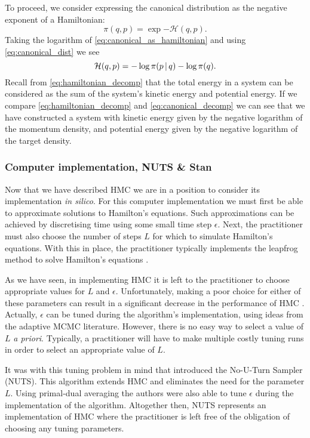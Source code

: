 To proceed, we consider expressing the canonical distribution as the
negative exponent of a Hamiltonian:
\begin{equation}
  \label{eq:canonical_as_hamiltonian}
  \pi(q, p) = \exp{-\mathcal{H}(q,p)}.
\end{equation}
Taking the logarithm of \cref{eq:canonical_as_hamiltonian} and using \cref{eq:canonical_dist}
we see
\begin{equation}
  \label{eq:canonical_decomp}
  \mathcal{H}(q, p) = -\log{\pi(p \,|\,q)} - \log{\pi(q)}.
\end{equation}
Recall from \cref{eq:hamiltonian_decomp} that the total energy in a system can be
considered as the sum of the system's kinetic energy and potential energy.  If we compare
\cref{eq:hamiltonian_decomp} and \cref{eq:canonical_decomp} we can see that we have
constructed a system with kinetic energy given by the negative logarithm of the momentum
density, and potential energy given by the negative logarithm of the target density.

\subsubsection{Computer implementation, NUTS \& Stan}

Now that we have described HMC we are in a position to consider its implementation
\emph{in silico}. For this computer implementation we must first be able to approximate
solutions to Hamilton's equations. Such approximations can be achieved by discretising
time using some small time step $\epsilon$. Next, the practitioner must also choose the
number of steps $L$ for which to simulate Hamilton's equations. With this in place, the
practitioner typically implements the leapfrog method to solve Hamilton's equations
\parencite{neal11}.

As we have seen, in implementing HMC it is left to the practitioner to choose appropriate
values for $L$ and $\epsilon$. Unfortunately, making a poor choice for either of these
parameters can result in a significant decrease in the performance of HMC
\parencite{hoffman14}. Actually, $\epsilon$ can be tuned during the algorithm's
implementation, using ideas from the adaptive MCMC literature. However, there is no easy
way to select a value of $L$ \emph{a priori}. Typically, a practitioner will have to make
multiple costly tuning runs in order to select an appropriate value of $L$.

It was with this tuning problem in mind that \textcite{hoffman14} introduced the No-U-Turn
Sampler (NUTS). This algorithm extends HMC and eliminates the need for the parameter $L$.
Using primal-dual averaging the authors were also able to tune $\epsilon$ during the
implementation of the algorithm. Altogether then, NUTS represents an implementation of HMC
where the practitioner is left free of the obligation of choosing any tuning parameters.

